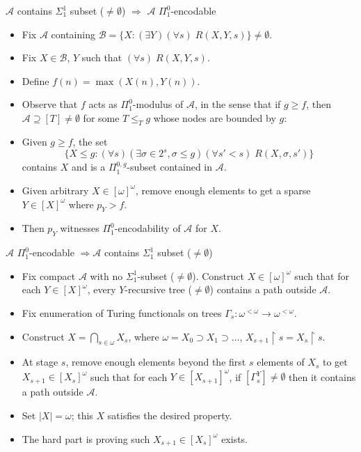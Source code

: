 \begin{frame}{$\mathcal{A}$ contains $\Sigma_1^1$ subset ($\neq\emptyset$)
$\Rightarrow$ $\mathcal{A}$ $\Pi_1^0$-encodable}
  \begin{itemize}
    \item Fix $\mathcal{A}$ containing $\mathcal{B} =\{X: (\exists
      Y)(\forall s)\; R(X,Y,s)\} \neq\emptyset$.
    \item Fix $X\in\mathcal{B}$, $Y$ such that $(\forall s)\;R(X,Y,s)$.
    \item Define $f(n)=\max(X(n),Y(n))$.
    \item Observe that $f$ acts as $\Pi_1^0$-modulus of $\mathcal{A}$, in
      the sense that if $g\geq f$, then $\mathcal{A}\supseteq[T]
      \neq\emptyset$ for some $T\leq_T g$ whose nodes are bounded by $g$:
    \item Given $g\geq f$, the set
      \[\{X\leq g:(\forall s)(\exists \sigma\in 2^s, \sigma\leq g)(\forall
      s'<s)\; R(X,\sigma,s')\}\]
      contains $X$ and is a $\Pi_1^{0,g}$-subset contained in
      $\mathcal{A}$.
    \item Given arbitrary $X\in[\omega]^\omega$, remove enough elements to
      get a sparse $Y\in[X]^\omega$ where $p_Y>f$.
    \item Then $p_Y$ witnesses $\Pi_1^0$-encodability of $\mathcal{A}$ for
      $X$.
  \end{itemize}
\end{frame}

\begin{frame}{$\mathcal{A}$ $\Pi_1^0$-encodable $\Rightarrow \mathcal{A}$
contains $\Sigma_1^1$ subset ($\neq\emptyset$)}
  \begin{itemize}
    \item Fix compact $\mathcal{A}$ with no $\Sigma_1^1$-subset
      ($\neq\emptyset$). Construct $X\in[\omega]^\omega$ such that for each
      $Y\in[X]^\omega$, every $Y$-recursive tree ($\neq\emptyset$) contains
      a path outside $\mathcal{A}$.

    \item Fix enumeration of Turing functionals on trees
      $\Gamma_s:\omega^{<\omega} \rightarrow \omega^{<\omega}$.

    \item Construct $X=\bigcap_{s\in\omega}X_s$, where
      $\omega=X_0\supset X_1\supset\ldots$, $X_{s+1}\restriction
      s=X_s\restriction s$.

    \item At stage $s$, remove enough elements beyond the first $s$
      elements of $X_s$ to get $X_{s+1}\in[X_s]^\omega$ such that for each
      $Y\in[X_{s+1}]^\omega$, if $[\Gamma_s^Y]\neq\emptyset$ then it
      contains a path outside $\mathcal{A}$.

    \item Set $|X|=\omega$; this $X$ satisfies the desired property.

    \item The hard part is proving such $X_{s+1}\in[X_s]^\omega$ exists.
  \end{itemize}
\end{frame}

